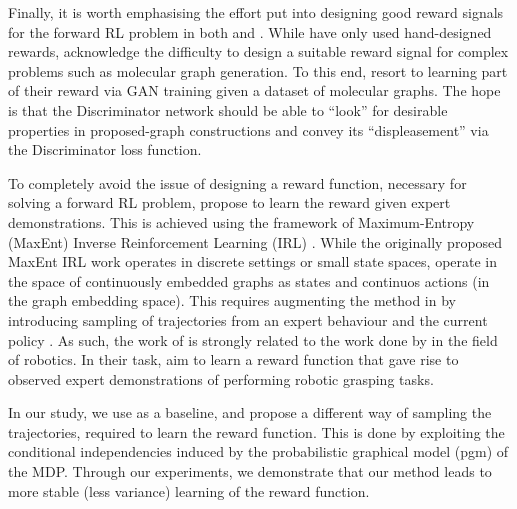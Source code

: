 \documentclass{report}
\numberwithin{equation}{section}
\numberwithin{figure}{section}
\numberwithin{table}{section}
\numberwithin{algorithm}{section}
\begin{document}
Finally, it is worth emphasising the effort put into 
designing good reward signals for the forward RL problem 
in both \cite{Darvariu} and \cite{GCNPolicyGraphGen}. While 
\cite{Darvariu} have only used hand-designed rewards, 
\cite{GCNPolicyGraphGen} acknowledge the difficulty to 
design a suitable reward signal for complex problems 
such as molecular graph generation. To this end, \cite{GCNPolicyGraphGen} resort to learning part 
of their reward via GAN training given a dataset of molecular 
graphs. The hope is that the Discriminator network should be 
able to ``look'' for desirable properties in proposed-graph 
constructions and convey its ``displeasement'' via the 
Discriminator loss function.

To completely avoid the issue of designing a reward function, 
necessary for solving a forward RL problem,
\cite{GraphOpt} propose to learn the reward given expert 
demonstrations. This is achieved using the framework of 
Maximum-Entropy (MaxEnt) Inverse Reinforcement 
Learning (IRL) \citep{Ziebart2008}. 
While the originally proposed MaxEnt IRL work \citep{Ziebart2008} 
operates in discrete settings or small state spaces, \cite{GraphOpt} 
operate in the space of continuously embedded graphs as states and 
continuos actions (in the graph embedding space). This 
requires augmenting the method in \cite{Ziebart2008} by 
introducing sampling of trajectories from an expert behaviour 
and the current policy \citep{FinnGCL}. As such, 
the work of \cite{GraphOpt} 
is strongly related to the work done by \cite{FinnGCL} in the field 
of robotics. In their task, \cite{FinnGCL} aim to learn a reward function 
that gave rise to observed expert demonstrations of performing 
robotic grasping tasks.

In our study, we use \cite{GraphOpt} as a baseline, and propose 
a different way of sampling the trajectories, required to learn 
the reward function. This is done by exploiting the conditional 
independencies induced by the probabilistic graphical 
model (pgm) of the MDP. Through our experiments, we demonstrate 
that our method leads to 
more stable (less variance) learning of the reward function.
\end{document}
